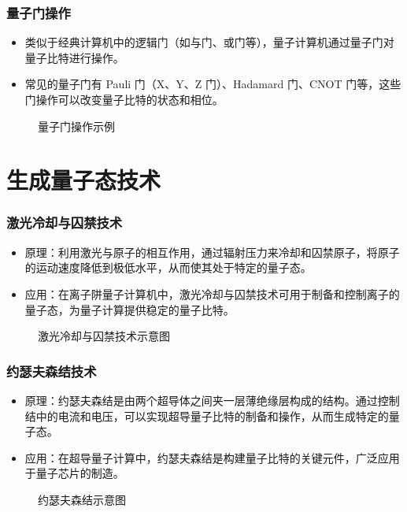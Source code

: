 \begin{frame}
    \frametitle{量子门操作}
    \begin{itemize}
        \item 类似于经典计算机中的逻辑门（如与门、或门等），量子计算机通过量子门对量子比特进行操作。
        \item 常见的量子门有 Pauli 门（X、Y、Z 门）、Hadamard 门、CNOT 门等，这些门操作可以改变量子比特的状态和相位。
    \end{itemize}
    \begin{figure}
        \centering
        \caption{量子门操作示例}
    \end{figure}
\end{frame}

\section{生成量子态技术}
\begin{frame}
    \frametitle{激光冷却与囚禁技术}
    \begin{itemize}
        \item 原理：利用激光与原子的相互作用，通过辐射压力来冷却和囚禁原子，将原子的运动速度降低到极低水平，从而使其处于特定的量子态。
        \item 应用：在离子阱量子计算机中，激光冷却与囚禁技术可用于制备和控制离子的量子态，为量子计算提供稳定的量子比特。
    \end{itemize}
    \begin{figure}
        \centering
        \caption{激光冷却与囚禁技术示意图}
    \end{figure}
\end{frame}

\begin{frame}
    \frametitle{约瑟夫森结技术}
    \begin{itemize}
        \item 原理：约瑟夫森结是由两个超导体之间夹一层薄绝缘层构成的结构。通过控制结中的电流和电压，可以实现超导量子比特的制备和操作，从而生成特定的量子态。
        \item 应用：在超导量子计算中，约瑟夫森结是构建量子比特的关键元件，广泛应用于量子芯片的制造。
    \end{itemize}
    \begin{figure}
        \centering
        \caption{约瑟夫森结示意图}
    \end{figure}
\end{frame}

